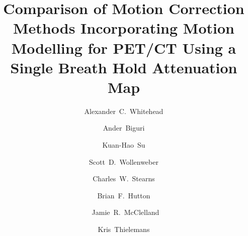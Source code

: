 \documentclass[misc, color=UCLburgundy, margin=1cm]{uclposter}
\begin{document}
    \title{Comparison of Motion Correction Methods Incorporating Motion Modelling for PET/CT Using a Single Breath Hold Attenuation Map}
    
    \author[12*]{Alexander~C.~Whitehead}
    \author[2]{Ander~Biguri}
    \author[3]{Kuan-Hao~Su}
    \author[3]{Scott~D.~Wollenweber}
    \author[3]{Charles~W.~Stearns}
    \author[1]{Brian~F.~Hutton}
    \author[2]{\newline~Jamie~R.~McClelland}
    \author[12]{Kris~Thielemans}
    
    
    \maketitle
\end{document}
